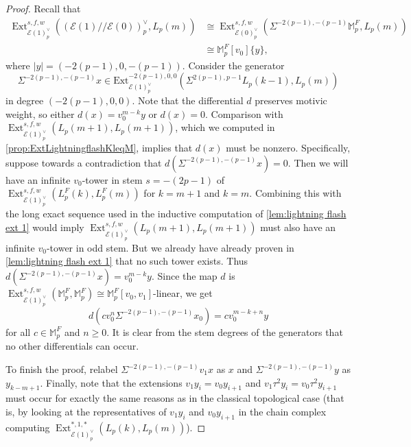 \documentclass{amsart}
\theoremstyle{plain}
\numberwithin{theorem}{section}
\numberwithin{equation}{section}
\numberwithin{figure}{section}
\DeclareMathOperator{\Ext}{Ext}
\newcommand{\mM}{{\mathbb M}}
\newcommand{\cE}{{\mathcal E}}
\newcommand{\0}{\langle 0 \rangle }
\begin{document}
\begin{proof}
Recall that 
\begin{align*}
    {\Ext}^{s,f,w}_{\mathcal{E}(1)^\vee_p}((\mathcal{E}(1)//\mathcal{E}(0))_p^\vee, L_p(m)) & \cong {\Ext}^{s,f,w}_{\mathcal{E}(0)^\vee_p}(\Sigma^{-2(p-1), -(p-1)}\mM_p^F, L_p(m)) \\
    & \cong \mM_p^F[v_0]\{y\},
\end{align*} where $|y| = (-2(p-1),0, -(p-1))$. Consider the generator 
\[
\Sigma^{-2(p-1), -(p-1)}x \in \text{Ext}^{-2(p-1),0,0}_{\mathcal{E}(1)^\vee_p}(\Sigma^{2(p-1), p-1}L_p(k-1), L_p(m))
\]
in degree $(-2(p-1),0,0)$. Note that the differential $d$ preserves motivic weight, so either $d(x) = v_0^{m-k }y$ or $d(x) = 0$. Comparison with  $\Ext^{s,f,w}_{\cE(1)_p^\vee} \left(L_p (m+1), L_p (m+1)\right)$, which we computed in \cref{prop:ExtLightningflashKleqM}, implies that $d(x)$ must be nonzero. Specifically, suppose towards a contradiction that $d(\Sigma^{-2(p-1), -(p-1)}x) = 0$. Then we will have an infinite $v_{0}$-tower in stem $s=-(2p-1)$ of $\Ext^{s,f,w}_{\mathcal{E}(1)^\vee_p}\left(L_p^F(k), L_p^F(m)\right)$ for $k=m+1$ and $k=m$. Combining this with the long exact sequence used in the inductive computation of \cref{lem:lightning flash ext 1} would imply $\Ext^{s,f,w}_{\mathcal{E}(1)^\vee_p}\left(L_p(m+1), L_p(m+1)\right)$ must also have an infinite $v_{0}$-tower in odd stem. But we already have already proven in \cref{lem:lightning flash ext 1} that no such tower exists. Thus $d(\Sigma^{-2(p-1), -(p-1)}x) = v_0^{m-k}y$. Since  the map $d$ is $\Ext^{s,f,w}_{\mathcal{E}(1)^\vee_p}\left(\mM_p^F, \mM_p^F\right) \cong \mM_{p}^{F}[v_{0},v_{1}]$-linear, we get 
\[
d(cv_{0}^{n}\Sigma^{-2(p-1), -(p-1)}x_0 ) = cv_{0}^{m - k + n}y
\]
for all $c \in \mM_{p}^{F}$ and $n \ge 0$. It is clear from the stem degrees of the generators that no other differentials can occur. 

To finish the proof, relabel $\Sigma^{-2(p-1), -(p-1)}v_1x$ as $x$ and $\Sigma^{-2(p-1), -(p-1)}y$ as $y_{k-m+1}$. Finally, note that the extensions $v_{1}y_{i} = v_{0}y_{i+1}$ and $v_{1}\tau^{2}y_{i} = v_{0}\tau^{2}y_{i+1}$ must occur for exactly the same reasons as in the classical topological case (that is, by looking at the representatives of $v_1y_i$ and $v_0y_{i+1}$ in the chain complex computing $\Ext_{\cE(1)_p^\vee}^{*,1,*}\left(L_p(k),L_p(m)\right)$).
\end{proof}
\end{document}
